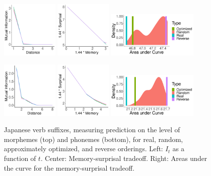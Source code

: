 \documentclass[11pt,letterpaper]{article}
\begin{document}
\begin{figure}
	\begin{center}
		\includegraphics[width=0.25\textwidth]{figures/Japanese-suffixes-byMorphemes-it-heldout.pdf}
		\includegraphics[width=0.25\textwidth]{figures/Japanese-suffixes-byMorphemes-memsurp-heldout.pdf}
		\includegraphics[width=0.4\textwidth]{figures/Japanese-suffixes-byMorphemes-auc-hist-heldout.pdf}

		\includegraphics[width=0.25\textwidth]{figures/Japanese-suffixes-byPhonemes-it-heldout.pdf}
		\includegraphics[width=0.25\textwidth]{figures/Japanese-suffixes-byPhonemes-memsurp-heldout.pdf}
		\includegraphics[width=0.4\textwidth]{figures/Japanese-suffixes-byPhonemes-auc-hist-heldout.pdf}
\end{center}
	\caption{Japanese verb suffixes, measuring prediction on the level of morphemes (top) and phonemes (bottom), for real, random, approximately optimized, and reverse orderings. Left: $I_t$ as a function of $t$. Center: Memory-surprisal tradeoff. Right: Areas under the curve for the memory-surprisal tradeoff.}\label{fig:jap-morph}
\end{figure}
\end{document}
